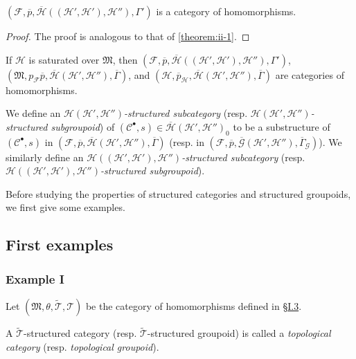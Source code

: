 \documentclass[a4paper,fleqn]{article}
\theoremstyle{plain}
\newenvironment{theorem}[1]
  {\renewcommand\theinnertheorem{#1}\innertheorem}
  {\endinnertheorem}
\theoremstyle{definition}
\newenvironment{definition}[1]
  {\renewcommand\theinnerdefinition{#1}\innerdefinition}
  {\endinnerdefinition}
\newcommand{\oldpage}[1]{{\marginpar{\footnotesize$\bigg\vert$\,\,\,\,\textit{p.~#1}}}}
\newcommand{\CC}{\mathcal{C}}
\newcommand{\HH}{\mathcal{H}}
\newcommand{\bHH}{\overline{\HH}}
\newcommand{\MM}{\mathfrak{M}}
\newcommand{\FF}{\mathcal{F}}
\newcommand{\TT}{\mathcal{T}}
\newcommand{\tTT}{\widetilde{\TT}}
\newcommand{\GG}{\mathcal{G}}
\begin{document}
\oldpage{386}

\begin{theorem}{2}
\label{theorem:ii-2}
  $(\FF,\overline{p},\bHH((\HH',\HH'),\HH''),\Gamma')$ is a category of homomorphisms.
\end{theorem}

\begin{proof}
  The proof is analogous to that of \cref{theorem:ii-1}.
\end{proof}

\begin{theorem}{3}
\label{theorem:ii-3}
  If $\HH$ is saturated over $\MM$, then $(\FF,\overline{p},\bHH((\HH',\HH'),\HH''),\Gamma')$, $(\MM,p_\FF\overline{p},\bHH(\HH',\HH''),\overline{\Gamma})$, and $(\HH,\overline{p}_\HH,\bHH(\HH',\HH''),\overline{\Gamma})$ are categories of homomorphisms.
\end{theorem}

\begin{definition}{6}
\label{definition:ii-6}
  We define an \emph{$\HH(\HH',\HH'')$-structured subcategory} (resp. \emph{$\HH(\HH',\HH'')$-structured subgroupoid}) of $(\CC^\bullet,s)\in\bHH(\HH',\HH'')_0$ to be a substructure of $(\CC^\bullet,s)$ in $(\FF,\overline{p},\bHH(\HH',\HH''),\overline{\Gamma})$ (resp. in $(\FF,\overline{p},\overline{\GG}(\HH',\HH''),\overline{\Gamma}_\GG)$).
  We similarly define an \emph{$\HH((\HH',\HH'),\HH'')$-structured subcategory} (resp. \emph{$\HH((\HH',\HH'),\HH'')$-structured subgroupoid}).
\end{definition}

Before studying the properties of structured categories and structured groupoids, we first give some examples.


\subsection{First examples}
\label{section:ii.3}

\subsubsection*{Example I}
\label{section:ii.3.i}

Let $(\MM,\theta,\tTT,\TT)$ be the category of homomorphisms defined in \hyperref[section:i.3]{§I.3}.

\begin{definition}{7}
\label{definition:ii-7}
  A $\tTT$-structured category (resp. $\tTT$-structured groupoid) is called a \emph{topological category} (resp. \emph{topological groupoid}).
\end{definition}
\end{document}
